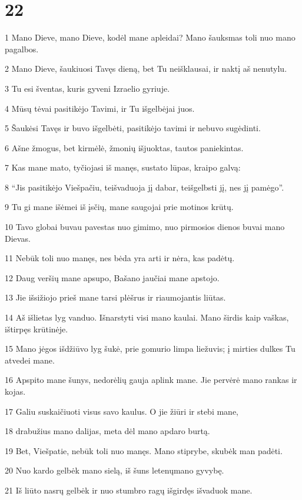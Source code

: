 \chapter{22}


\par 1 Mano Dieve, mano Dieve, kodėl mane apleidai? Mano šauksmas toli nuo mano pagalbos. 
\par 2 Mano Dieve, šaukiuosi Tavęs dieną, bet Tu neišklausai, ir naktį aš nenutylu. 
\par 3 Tu esi šventas, kuris gyveni Izraelio gyriuje. 
\par 4 Mūsų tėvai pasitikėjo Tavimi, ir Tu išgelbėjai juos. 
\par 5 Šaukėsi Tavęs ir buvo išgelbėti, pasitikėjo tavimi ir nebuvo sugėdinti. 
\par 6 Aš­ne žmogus, bet kirmėlė, žmonių išjuoktas, tautos paniekintas. 
\par 7 Kas mane mato, tyčiojasi iš manęs, sustato lūpas, kraipo galvą: 
\par 8 “Jis pasitikėjo Viešpačiu, teišvaduoja jį dabar, teišgelbsti jį, nes jį pamėgo”. 
\par 9 Tu gi mane išėmei iš įsčių, mane saugojai prie motinos krūtų. 
\par 10 Tavo globai buvau pavestas nuo gimimo, nuo pirmosios dienos buvai mano Dievas. 
\par 11 Nebūk toli nuo manęs, nes bėda yra arti ir nėra, kas padėtų. 
\par 12 Daug veršių mane apsupo, Bašano jaučiai mane apstojo. 
\par 13 Jie išsižiojo prieš mane tarsi plėšrus ir riaumojantis liūtas. 
\par 14 Aš išlietas lyg vanduo. Išnarstyti visi mano kaulai. Mano širdis kaip vaškas, ištirpęs krūtinėje. 
\par 15 Mano jėgos išdžiūvo lyg šukė, prie gomurio limpa liežuvis; į mirties dulkes Tu atvedei mane. 
\par 16 Apspito mane šunys, nedorėlių gauja aplink mane. Jie pervėrė mano rankas ir kojas. 
\par 17 Galiu suskaičiuoti visus savo kaulus. O jie žiūri ir stebi mane, 
\par 18 drabužius mano dalijas, meta dėl mano apdaro burtą. 
\par 19 Bet, Viešpatie, nebūk toli nuo manęs. Mano stiprybe, skubėk man padėti. 
\par 20 Nuo kardo gelbėk mano sielą, iš šuns letenų­mano gyvybę. 
\par 21 Iš liūto nasrų gelbėk ir nuo stumbro ragų išgirdęs išvaduok mane. 
